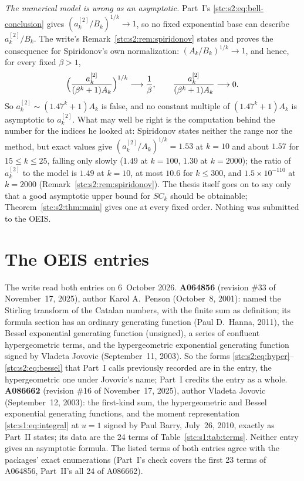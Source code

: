 \documentclass[11pt,letterpaper]{article}
\numberwithin{equation}{section}
\theoremstyle{remark}\newtheorem{remark}[theorem]{Remark}
\begin{document}
\emph{The numerical model is wrong as an asymptotic.} Part~I's \eqref{stc:s2:eq:bell-conclusion} gives $(a^{[2]}_k/B_k)^{1/k}\to1$, so no fixed exponential base can describe $a^{[2]}_k/B_k$. The write's Remark~\ref{stc:s2:rem:spiridonov} states and proves the consequence for Spiridonov's own normalization: $(A_k/B_k)^{1/k}\to1$, and hence, for every fixed $\beta>1$,
\[
 \Bigl(\frac{a^{[2]}_k}{(\beta^k+1)A_k}\Bigr)^{1/k}\longrightarrow\frac1\beta,\qquad
 \frac{a^{[2]}_k}{(\beta^k+1)A_k}\longrightarrow0 .
\]
So $a^{[2]}_k\sim(1.47^k+1)A_k$ is false, and no constant multiple of $(1.47^k+1)A_k$ is asymptotic to $a^{[2]}_k$. What may well be right is the computation behind the number for the indices he looked at: Spiridonov states neither the range nor the method, but exact values give $(a^{[2]}_k/A_k)^{1/k}=1.53$ at $k=10$ and about $1.57$ for $15\le k\le25$, falling only slowly ($1.49$ at $k=100$, $1.30$ at $k=2000$); the ratio of $a^{[2]}_k$ to the model is $1.49$ at $k=10$, at most $10.6$ for $k\le300$, and $1.5\times10^{-110}$ at $k=2000$ (Remark~\ref{stc:s2:rem:spiridonov}). The thesis itself goes on to say only that a good asymptotic upper bound for $SC_k$ should be obtainable; Theorem~\ref{stc:s2:thm:main} gives one at every fixed order. Nothing was submitted to the OEIS.

\section*{The OEIS entries}\label{stc:sec:oeis}
The write read both entries on 6~October 2026. \textbf{A064856} (revision \#33 of November~17, 2025), author Karol A.~Penson (October~8, 2001): named the Stirling transform of the Catalan numbers, with the finite sum as definition; its formula section has an ordinary generating function (Paul D.~Hanna, 2011), the Bessel exponential generating function (unsigned), a series of confluent hypergeometric terms, and the hypergeometric exponential generating function signed by Vladeta Jovovic (September~11, 2003). So the forms \eqref{stc:s2:eq:hyper}--\eqref{stc:s2:eq:bessel} that Part~I calls previously recorded are in the entry, the hypergeometric one under Jovovic's name; Part~I credits the entry as a whole. \textbf{A086662} (revision \#16 of November~17, 2025), author Vladeta Jovovic (September~12, 2003): the first-kind sum, the hypergeometric and Bessel exponential generating functions, and the moment representation \eqref{stc:s1:eq:integral} at $u=1$ signed by Paul Barry, July~26, 2010, exactly as Part~II states; its data are the 24 terms of Table~\ref{stc:s1:tab:terms}. Neither entry gives an asymptotic formula. The listed terms of both entries agree with the packages' exact enumerations (Part~I's check covers the first 23 terms of A064856, Part~II's all 24 of A086662).
\end{document}
